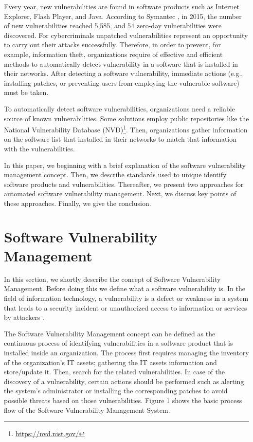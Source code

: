 \documentclass{llncs}
\begin{document}
\par Every year, new vulnerabilities are found in software products such as Internet Explorer, Flash 
 Player, and Java. According to Symantec \cite{symantec}, in 2015, the number of new vulnerabilities 
 reached 5,585, and 54 zero-day vulnerabilities were discovered. For cybercriminals 
 unpatched vulnerabilities represent an opportunity to carry out their attacks successfully. 
 Therefore, in order to prevent, for example, information theft, organizations require of 
 effective and efficient methods to automatically detect vulnerability in a software that is installed in 
 their networks. After detecting a software vulnerability, immediate actions (e.g., installing 
 patches, or preventing users from employing the vulnerable software) must be taken. 
 \par To automatically detect software vulnerabilities, organizations need a reliable source of 
 known vulnerabilities. Some solutions employ public repositories like the National 
 Vulnerability Database (NVD)\footnote{\url{https://nvd.nist.gov/}}. Then, organizations gather information on the software list that  
 installed in their networks to match that information with the vulnerabilities. 
 \par In this paper, we beginning with a brief explanation of the software vulnerability 
 management concept. Then, we describe standards used to unique identify software products 
 and vulnerabilities. Thereafter, we present two approaches for automated software vulnerability management. Next, we discuss key points of these approaches. Finally, we give the conclusion.
       
\section{Software Vulnerability Management}

In this section, we shortly describe the concept of Software Vulnerability Management. Before doing this we define what a software vulnerability is. In the field of information technology, a vulnerability is a defect or weakness in a system that leads to a security incident or unauthorized access to information or services by attackers \cite{vuln}.  

\par The Software Vulnerability Management concept can be defined as the continuous process of identifying vulnerabilities in a software product that is installed inside an organization. The process first requires managing the inventory of the organization's IT assets; gathering the IT assets information and store/update it. Then, search for the related vulnerabilities. In case of the discovery of a vulnerability, certain actions should be performed such as alerting the system's administrator or installing the corresponding patches to avoid possible threats based on those vulnerabilities. Figure 1 shows the  basic process flow of the Software Vulnerability Management System.
\end{document}
